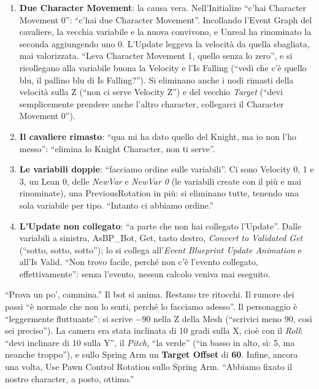 \begin{enumerate}
        dopo''.
  \item \textbf{Due Character Movement}: la causa vera. Nell'Initialize ``c'hai Character
        Movement 0'': ``c'hai due Character Movement''. Incollando l'Event Graph del
        cavaliere, la vecchia variabile e la nuova convivono, e Unreal ha rinominato la
        seconda aggiungendo uno 0. L'Update leggeva la velocità da quella sbagliata, mai
        valorizzata. ``Leva Character Movement 1, quello senza lo zero'', e si ricollegano
        alla variabile buona la Velocity e l'Is Falling (``vedi che c'è quello blu, il
        pallino blu di Is Falling?''). Si eliminano anche i nodi rimasti della velocità
        sulla Z (``non ci serve Velocity Z'') e del vecchio \emph{Target} (``devi
        semplicemente prendere anche l'altro character, collegarci il Character
        Movement 0'').
  \item \textbf{Il cavaliere rimasto}: ``qua mi ha dato quello del Knight, ma io non l'ho
        messo'': ``elimina lo Knight Character, non ti serve''.
  \item \textbf{Le variabili doppie}: ``facciamo ordine sulle variabili''. Ci sono Velocity
        0, 1 e 3, un Lean 0, delle \emph{NewVar} e \emph{NewVar 0} (le variabili create
        con il più e mai rinominate), una PreviousRotation in più: si eliminano tutte,
        tenendo una sola variabile per tipo. ``Intanto ci abbiamo ordine.''
  \item \textbf{L'Update non collegato}: ``a parte che non hai collegato l'Update''. Dalle
        variabili a sinistra, AsBP\_Bot, Get, tasto destro, \emph{Convert to Validated
        Get} (``sotto, sotto, sotto''); lo si collega all'\emph{Event Blueprint Update
        Animation} e all'Is Valid. ``Non trovo facile, perché non c'è l'evento collegato,
        effettivamente'': senza l'evento, nessun calcolo veniva mai eseguito.
\end{enumerate}
``Prova un po', cammina.'' Il bot si anima. Restano tre ritocchi. Il rumore dei passi
``è normale che non lo senti, perché lo facciamo adesso''. Il personaggio è
``leggermente fluttuante'': si scrive \textbf{$-90$} nella Z della Mesh (``scrivici meno
90, così sei preciso''). La camera era stata inclinata di 10 gradi sulla X, cioè con il
\emph{Roll}: ``devi inclinare di 10 sulla Y'', il \emph{Pitch}, ``la verde'' (``in basso
in alto, sì: 5, ma neanche troppo''), e sullo Spring Arm un \textbf{Target Offset} di
\textbf{60}. Infine, ancora una volta, Use Pawn Control Rotation sullo Spring Arm.
``Abbiamo fixato il nostro character, a posto, ottimo.''

